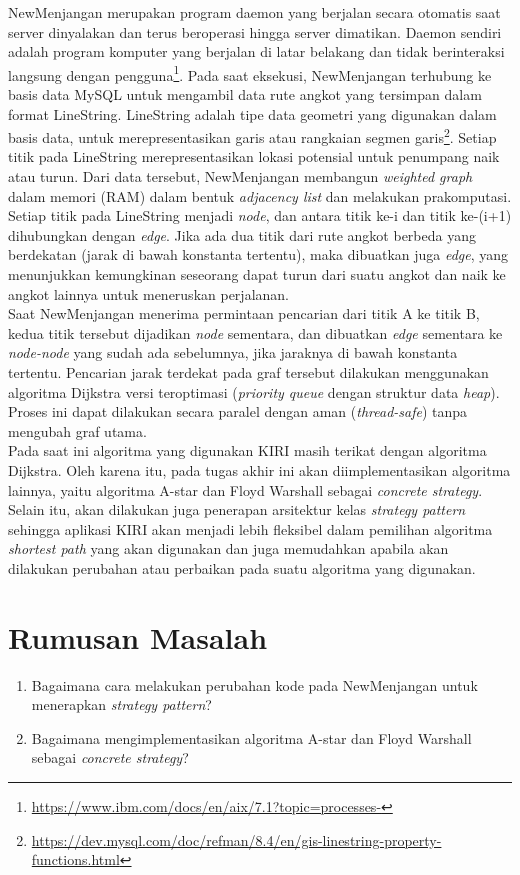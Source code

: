 NewMenjangan merupakan program daemon yang berjalan secara otomatis saat server dinyalakan dan terus beroperasi hingga server dimatikan. Daemon sendiri adalah program komputer yang berjalan di latar belakang dan tidak berinteraksi langsung dengan pengguna\footnote{\url{https://www.ibm.com/docs/en/aix/7.1?topic=processes-}}. Pada saat eksekusi, NewMenjangan terhubung ke basis data MySQL untuk mengambil data rute angkot yang tersimpan dalam format LineString. LineString adalah tipe data geometri yang digunakan dalam basis data, untuk merepresentasikan garis atau rangkaian segmen garis\footnote{\url{https://dev.mysql.com/doc/refman/8.4/en/gis-linestring-property-functions.html}}. Setiap titik pada LineString merepresentasikan lokasi potensial untuk penumpang naik atau turun. Dari data tersebut, NewMenjangan membangun \textit{weighted graph} dalam memori (RAM) dalam bentuk \textit{adjacency list} dan melakukan prakomputasi. Setiap titik pada LineString menjadi \textit{node}, dan antara titik ke-i dan titik ke-(i+1) dihubungkan dengan \textit{edge}. Jika ada dua titik dari rute angkot berbeda yang berdekatan (jarak di bawah konstanta tertentu), maka dibuatkan juga \textit{edge}, yang menunjukkan kemungkinan seseorang dapat turun dari suatu angkot dan naik ke angkot lainnya untuk meneruskan perjalanan. 
\\
Saat NewMenjangan menerima permintaan pencarian dari titik A ke titik B, kedua titik tersebut dijadikan \textit{node} sementara, dan dibuatkan \textit{edge} sementara ke \textit{node-node} yang sudah ada sebelumnya, jika jaraknya di bawah konstanta tertentu. Pencarian jarak terdekat pada graf tersebut dilakukan menggunakan algoritma Dijkstra versi teroptimasi (\textit{priority queue} dengan struktur data \textit{heap}). Proses ini dapat dilakukan secara paralel dengan aman (\textit{thread-safe}) tanpa mengubah graf utama.
\\
Pada saat ini algoritma yang digunakan KIRI masih terikat dengan algoritma Dijkstra. Oleh karena itu, pada tugas akhir ini akan diimplementasikan algoritma lainnya, yaitu algoritma A-star dan Floyd Warshall sebagai \textit{concrete strategy}. Selain itu, akan dilakukan juga penerapan arsitektur kelas \textit{strategy pattern} sehingga aplikasi KIRI akan menjadi lebih fleksibel dalam pemilihan algoritma \textit{shortest path} yang akan digunakan dan juga memudahkan apabila akan dilakukan perubahan atau perbaikan pada suatu algoritma yang digunakan.

\section{Rumusan Masalah}
\label{sec:rumusan}
	\begin{enumerate}
                \item Bagaimana cara melakukan perubahan kode pada NewMenjangan untuk menerapkan \textit{strategy pattern}?
                \item Bagaimana mengimplementasikan algoritma A-star dan Floyd Warshall sebagai \textit{concrete strategy}?
	\end{enumerate}

